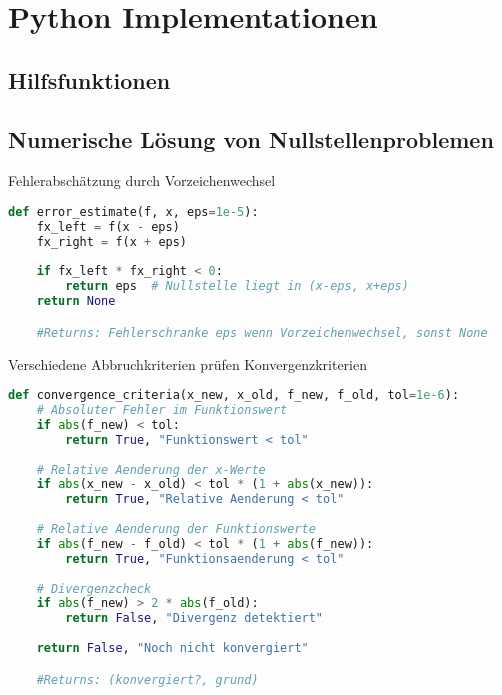 
\section{Python Implementationen}

\subsection{Hilfsfunktionen}

\subsection{Numerische Lösung von Nullstellenproblemen}

\begin{examplecode}{Fehlerabschätzung durch Vorzeichenwechsel}
\begin{lstlisting}[language=Python, style=basesmol]
def error_estimate(f, x, eps=1e-5):
    fx_left = f(x - eps)
    fx_right = f(x + eps)
    
    if fx_left * fx_right < 0:
        return eps  # Nullstelle liegt in (x-eps, x+eps)
    return None

    #Returns: Fehlerschranke eps wenn Vorzeichenwechsel, sonst None
\end{lstlisting}
\end{examplecode}

\begin{examplecode}{Verschiedene Abbruchkriterien prüfen} Konvergenzkriterien
\begin{lstlisting}[language=Python, style=basesmol]
def convergence_criteria(x_new, x_old, f_new, f_old, tol=1e-6):
    # Absoluter Fehler im Funktionswert
    if abs(f_new) < tol:
        return True, "Funktionswert < tol"
        
    # Relative Aenderung der x-Werte
    if abs(x_new - x_old) < tol * (1 + abs(x_new)):
        return True, "Relative Aenderung < tol"
        
    # Relative Aenderung der Funktionswerte
    if abs(f_new - f_old) < tol * (1 + abs(f_new)):
        return True, "Funktionsaenderung < tol"
        
    # Divergenzcheck
    if abs(f_new) > 2 * abs(f_old):
        return False, "Divergenz detektiert"
        
    return False, "Noch nicht konvergiert"

    #Returns: (konvergiert?, grund)
\end{lstlisting}
\end{examplecode}

